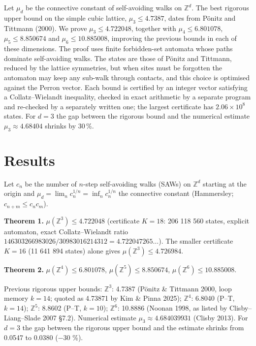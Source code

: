\documentclass[11pt,a4paper]{report}
\begin{document}
\makepapertitle

\begin{paperabstract}
Let \(\mu_d\) be the connective constant of self-avoiding walks on \(\mathbb Z^d\). The best rigorous upper bound on
the simple cubic lattice, \(\mu_3\le 4.7387\), dates from Pönitz and Tittmann (2000). We prove
\(\mu_3\le 4.722048\), together with \(\mu_4\le 6.801078\), \(\mu_5\le 8.850674\) and \(\mu_6\le 10.885008\), improving
the previous bounds in each of these dimensions. The proof uses finite forbidden-set automata whose paths dominate
self-avoiding walks. The states are those of Pönitz and Tittmann, reduced by the lattice symmetries, but when sites
must be forgotten the automaton may keep any sub-walk through contacts, and this choice is optimised against the
Perron vector. Each bound is certified by an integer vector satisfying a Collatz--Wielandt inequality, checked in
exact arithmetic by a separate program and re-checked by a separately written one; the largest certificate has
\(2.06\times10^8\) states. For \(d=3\) the gap
between the rigorous bound and the numerical estimate \(\mu_3\approx4.68404\) shrinks by 30\,\%.
\end{paperabstract}

\section{Results}

Let \(c_n\) be the number of \(n\)-step self-avoiding walks (SAWs) on \(\mathbb Z^d\) starting at the origin and
\(\mu_d=\lim_n c_n^{1/n}=\inf_n c_n^{1/n}\) the connective constant (Hammersley; \(c_{n+m}\le c_nc_m\)).

\textbf{Theorem 1.} \(\mu(\mathbb Z^3)\le 4.722048\) (certificate \(K=18\): 206 118 560 states, explicit automaton,
exact Collatz--Wielandt ratio \(146303266983026/30983016214312=4.722047265\ldots\)). The smaller certificate
\(K=16\) (11 641 894 states) alone gives \(\mu(\mathbb Z^3)\le4.726984\).

\textbf{Theorem 2.} \(\mu(\mathbb Z^4)\le 6.801078\), \(\mu(\mathbb Z^5)\le 8.850674\), \(\mu(\mathbb Z^6)\le 10.885008\).

Previous rigorous upper bounds: \(\mathbb Z^3\): 4.7387 (Pönitz \& Tittmann 2000, loop memory \(k=14\); quoted as
4.73871 by Kim \& Pinna 2025); \(\mathbb Z^4\): 6.8040 (P--T, \(k=14\)); \(\mathbb Z^5\): 8.8602 (P--T, \(k=10\));
\(\mathbb Z^6\): 10.8886 (Noonan 1998, as listed by Clisby--Liang--Slade 2007 §7.2). Numerical estimate
\(\mu_3\approx4.684039931\) (Clisby 2013). For \(d=3\) the gap between the rigorous upper bound and the estimate
shrinks from 0.0547 to 0.0380 (−30 \%).
\end{document}
